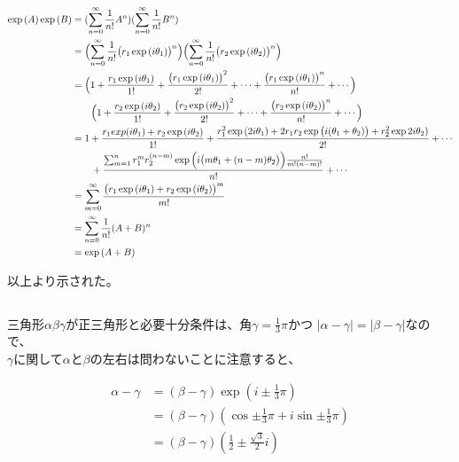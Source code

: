 \documentclass[dvipdfmx,a4paper]{jsarticle}
\begin{document}
  \begin{align*}
  \exp{(A)}\exp{(B)} &= (\sum_{n=0}^{\infty}\frac{1}{n!}A^n)(\sum_{n=0}^{\infty}\frac{1}{n!}B^n)\\
  &= \Bigl(\sum_{n=0}^{\infty}\frac{1}{n!}\bigl(r_1\exp{(i\theta_1)}\bigr)^n\Bigr)\Bigl(\sum_{n=0}^{\infty}\frac{1}{n!}\bigl(r_2\exp{(i\theta_2)}\bigr)^n\Bigr)\\
  &= \Bigl(1 + \frac{r_1\exp{(i\theta_1)}}{1!} + \frac{\bigl(r_1\exp{(i\theta_1)}\bigr)^2}{2!} + \cdots + \frac{\bigl(r_1\exp{(i\theta_1)}\bigr)^n}{n!} + \cdots\Bigr)\\
  &\qquad\Bigl(1 + \frac{r_2\exp{(i\theta_2)}}{1!} + \frac{\bigl(r_2\exp{(i\theta_2)}\bigr)^2}{2!} + \cdots + \frac{\bigl(r_2\exp{(i\theta_2)}\bigr)^n}{n!} + \cdots\Bigr)\\
  &= 1 + \frac{r_1exp{(i\theta_1)} + r_2\exp{(i\theta_2)}}{1!} + \frac{r_1^2\exp{(2i\theta_1)} + 2r_1r_2\exp{\bigl(i(\theta_1+\theta_2)\bigr)} + r_2^2\exp{2i\theta_2)}}{2!} + \cdots \\
  &\qquad + \frac{\sum_{m=1}^{n}r_1^mr_2^{(n-m)}\exp{\Bigl(i\bigl(m\theta_1 + (n-m)\theta_2\bigr)\Bigr)}\frac{n!}{m!(n-m)!}}{n!} + \cdots\\
  &= \sum_{m=0}^{\infty}\frac{\bigl(r_1\exp{(i\theta_1)} + r_2\exp{(i\theta_2)}\bigr)^m}{m!}\\
  &= \sum_{n=0}^{\infty}\frac{1}{n!}(A+B)^n\\
  &= \exp{(A+B)}
 \end{align*}
 
 以上より示された。\\
 
\subsection{}

\subsubsection{}

三角形$\alpha\beta\gamma$が正三角形と必要十分条件は、角$\gamma = \frac{1}{3}\pi$かつ $|\alpha-\gamma| = |\beta-\gamma|$なので、\\
$\gamma$に関して$\alpha$と$\beta$の左右は問わないことに注意すると、

\begin{align*}
\alpha-\gamma &= (\beta-\gamma)\exp{(i\pm\frac{1}{3}\pi)}\\
&= (\beta-\gamma)(\cos{\pm\frac{1}{3}\pi} + i\sin{\pm\frac{1}{3}\pi})\\
&= (\beta-\gamma)(\frac{1}{2} \pm \frac{\sqrt{3}}{2}i)
\end{align*}
\end{document}

